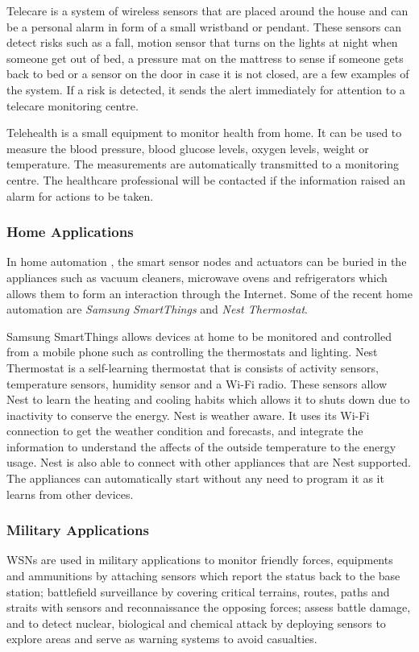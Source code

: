 Telecare is a system of wireless sensors that are placed around the house and can be a personal alarm in form of a small wristband or pendant. These sensors can detect risks such as a fall, motion sensor that turns on the lights at night when someone get out of bed, a pressure mat on the mattress to sense if someone gets back to bed or a sensor on the door in case it is not closed, are a few examples of the system. If a risk is detected, it sends the alert immediately for attention to a telecare monitoring centre. 

Telehealth is a small equipment to monitor health from home. It can be used to measure the blood pressure, blood glucose levels, oxygen levels, weight or temperature. The measurements are automatically transmitted to a monitoring centre. The healthcare professional will be contacted if the information raised an alarm for actions to be taken. 

\subsubsection{Home Applications}
In home automation \cite{homeautomation}, the smart sensor nodes and actuators can be buried in the appliances such as vacuum cleaners, microwave ovens and refrigerators which allows them to form an interaction through the Internet. Some of the recent home automation are \textit{Samsung SmartThings} and \textit{Nest Thermostat}.

Samsung SmartThings allows devices at home to be monitored and controlled from a mobile phone such as controlling the thermostats and lighting. Nest Thermostat is a self-learning thermostat that is consists of activity sensors, temperature sensors, humidity sensor and a Wi-Fi radio. These sensors allow Nest to learn the heating and cooling habits which allows it to shuts down due to inactivity to conserve the energy. Nest is weather aware. It uses its Wi-Fi connection to get the weather condition and forecasts, and integrate the information to understand the affects of the outside temperature to the energy usage. Nest is also able to connect with other appliances that are Nest supported. The appliances can automatically start without any need to program it as it learns from other devices.

\subsubsection{Military Applications}
WSNs are used in military applications to monitor friendly forces, equipments and ammunitions by attaching sensors which report the status back to the base station; battlefield surveillance by covering critical terrains, routes, paths and straits with sensors and reconnaissance the opposing forces; assess battle damage, and to detect nuclear, biological and chemical attack by deploying sensors to explore areas and serve as warning systems to avoid casualties.

